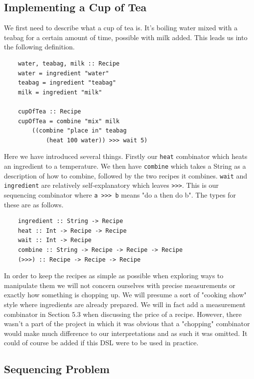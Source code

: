 \documentclass[11pt]{article}
\begin{document}
\subsection{Implementing a Cup of Tea}

We first need to describe what a cup of tea is. It's boiling water
mixed with a teabag for a certain amount of time, possible with milk added.
This leads us into the following definition.

\begin{lstlisting}
    water, teabag, milk :: Recipe
    water = ingredient "water"
    teabag = ingredient "teabag"
    milk = ingredient "milk"

    cupOfTea :: Recipe
    cupOfTea = combine "mix" milk
        ((combine "place in" teabag
            (heat 100 water)) >>> wait 5)
\end{lstlisting}

Here we have introduced several things. Firstly our \texttt{heat} combinator which heats an
ingredient to a temperature. We then have \texttt{combine} which takes a String as a description
of how to combine, followed by the two recipes it combines. \texttt{wait} and \texttt{ingredient} are
relatively self-explanatory which leaves \texttt{>>>}. This is our sequencing combinator
where \texttt{a >>> b} means "do a then do b". The types for these are as follows.

\begin{lstlisting}
    ingredient :: String -> Recipe
    heat :: Int -> Recipe -> Recipe
    wait :: Int -> Recipe
    combine :: String -> Recipe -> Recipe -> Recipe
    (>>>) :: Recipe -> Recipe -> Recipe
\end{lstlisting}

In order to keep the recipes as simple as possible when exploring ways to manipulate them
we will not concern ourselves with precise measurements or exactly how something is chopping
up. We will presume a sort of "cooking show" style where ingredients are already prepared.
We will in fact add a measurement combinator in Section 5.3 when discussing the price of a recipe.
However, there wasn't a part of the project in which it was obvious that a "chopping" combinator
would make much difference to our interpretations and as such it was omitted. It could of course
be added if this DSL were to be used in practice.

\subsection{Sequencing Problem}
\end{document}
